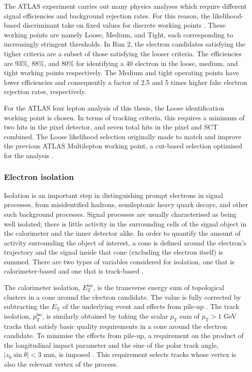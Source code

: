 The ATLAS experiment carries out many physics analyses which require different signal efficiencies and background rejection rates. For this reason, the likelihood-based discriminant take on fixed values for discrete working points \cite{ATLAS_electron_efficiency_2015-2016}. These working points are namely Loose, Medium, and Tight, each corresponding to increasingly stringent thresholds. In Run 2, the electron candidates satisfying the tigher criteria are a subset of those satisfying the looser criteria. The efficiencies are 93\%, 88\%, and 80\% for identifying a \unit{40}{\GeV} electron in the loose, medium, and tight working points respectively. The Medium and tight operating points have lower efficiencies and consequently a factor of 2.5 and 5 times higher fake electron rejection rates, respectively. 

For the ATLAS four lepton analysis of this thesis, the Loose identification working point is chosen. In terms of tracking criteria, this requires a minimum of two hits in the pixel detector, and seven total hits in the pixel and SCT combined. The Loose likelihood selection originally made to match and improve the previous ATLAS Multilepton working point, a cut-based selection optimised for the \HFourL analysis \cite{ATLAS_muon_reco_2011}.

\subsubsection{Electron isolation}

Isolation is an important step in distinguishing prompt electrons in signal processes, from misidentified hadrons, semileptonic heavy quark decays, and other such background processes. Signal processes are usually characterised as being well isolated; there is little activity in the surrounding cells of the signal object in the calorimeter and the inner detector alike. In order to quantify the amount of activity surrounding the object of interest, a cone is defined around the electron's trajectory and the signal inside that cone (excluding the electron itself) is summed. There are two types of variables considered for isolation, one that is calorimeter-based and one that is track-based \cite{ATLAS_electron_efficiency_2015-2016}. 

The calorimeter isolation, $E_{\text{T}}^{\text{iso}}$, is the transverse energy sum of topological clusters in a cone around the electron candidate. The value is fully corrected by subtracting the $E_{\text{T}}$ of the underlying event and effects from pile-up \cite{ATLAS_electron_photon_triggers_run2, ATLAS_electron_efficiency_2015-2016}. The track isolation, $p_{\text{T}}^{\text{iso}}$, is similarly obtained by taking the scalar $p_{\text{T}}$ sum of $p_{\text{T}}>1$ GeV tracks that satisfy basic quality requirements in a cone around the electron candidate. To minimise the effects from pile-up, a requirement on the product of the longitudinal impact parameter and the sine of the polar track angle, $|z_0\sin\theta|<3$ mm, is imposed \cite{ATLAS_electron_efficiency_2015-2016}. This requirement selects tracks whose vertex is also the relevant vertex of the process. 

